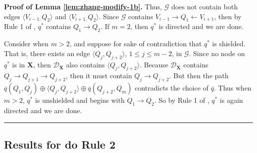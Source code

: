 \documentclass[11pt]{article}
\newcommand{\BlackBox}{\rule{1.5ex}{1.5ex}}  %
\newcommand{\mb}[1]{\mathbf{#1}}
\newcommand{\g}[1][G]{\mathcal{#1}}
\newenvironment{proofof}[1][]{\noindent \textbf{Proof of #1.}}{\hfill\BlackBox}
\begin{document}
\begin{proofof}[Lemma \ref{lem:zhang-modify-1b}]
    Thus, $\g$ does not contain both edges $\langle V_{i-1,} Q_2 \rangle$ and $\langle V_{i+1,} Q_2 \rangle$. Since $\g$ contains $V_{i-1} \to Q_1 \gets V_{i+1}$, then by Rule 1 of \cite{meek1995causal}, $q^*$ contains $Q_1 \to Q_2$. If $m=2$, then $q^*$ is directed and we are done.

    Consider when $m>2$, and suppose for sake of contradiction that $q^*$ is shielded. That is, there exists an edge $\langle Q_j, Q_{j+2} \rangle$, $1 \le j \le m-2$, in $\g$. Since no node on $q^*$ is in $\mb{X}$, then $\g[D]_{\overline{\mb{X}}}$ also contains $\langle Q_j, Q_{j+2} \rangle$. Because $\g[D]_{\overline{\mb{X}}}$ contains $Q_j \to Q_{j+1} \to Q_{j+2}$, then it must contain $Q_j \to Q_{j+2}$. But then the path $\overline{q}(Q_1, Q_j) \oplus \langle Q_j, Q_{j+2} \rangle \oplus \overline{q}(Q_{j+2}, Q_m)$ contradicts the choice of $\overline{q}$. Thus when $m>2$, $q^*$ is unshielded and begins with $Q_1 \to Q_2$. So by Rule 1 of \cite{meek1995causal}, $q^*$ is again directed and we are done.
\end{proofof}






\subsection{Results for do Rule 2}

\end{document}
